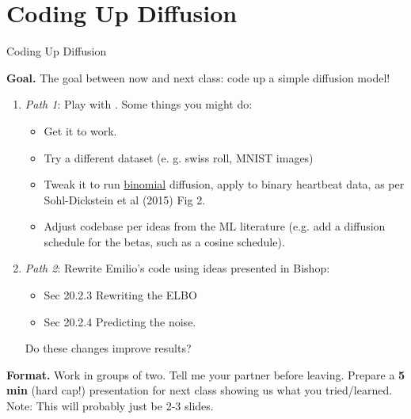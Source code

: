 \documentclass[10pt]{beamer}
\begin{document}
\section{Coding Up Diffusion}


\begin{frame}{Coding Up Diffusion}

\colorbox{green!30}{\textbf{Goal.}} The goal between now and next class: \alert{code up a simple diffusion model!} \pause 

\begin{enumerate}
\item \textit{Path 1}: Play with .  Some things you might do:
	\begin{itemize}
	\item Get it to work. 
	\item Try a different dataset (e. g. swiss roll, MNIST images)  
	\item Tweak it to run \underline{binomial} diffusion, apply to binary heartbeat data, as per Sohl-Dickstein et al (2015) Fig 2.
	\item Adjust codebase per ideas from the ML literature (e.g. add a diffusion schedule for the betas, such as a cosine schedule).  
	\end{itemize} \pause 
\item \textit{Path 2}: Rewrite Emilio's code using ideas presented in Bishop:
	\begin{itemize}
	\item Sec 20.2.3 Rewriting the ELBO 
	\item Sec 20.2.4 Predicting the noise.  
	\end{itemize} 
Do these changes improve results?
\end{enumerate}
\pause 
\colorbox{red!30}{\textbf{Format.}} Work in groups of two.  Tell me your partner before leaving.  Prepare a \textbf{5 min} \alert{(hard cap!)} presentation for next class showing us what you tried/learned. Note: This will probably just be 2-3 slides.  
\end{frame}
\end{document}

